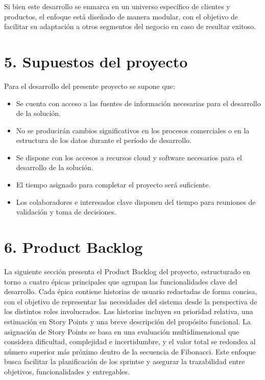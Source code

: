 \documentclass[
11pt, %
]{charter}
\begin{document}
Si bien este desarrollo se enmarca en un universo específico de clientes y productos, el enfoque está diseñado de manera modular, con el objetivo de facilitar su adaptación a otros segmentos del negocio en caso de resultar exitoso.

\section{5. Supuestos del proyecto}
\label{sec:supuestos}

Para el desarrollo del presente proyecto se supone que: 
\begin{itemize}
	\item Se cuenta con acceso a las fuentes de información necesarias para el desarrollo de la solución. 
        \item No se producirán cambios significativos en los procesos comerciales o en la estructura de los datos durante el período de desarrollo.
	\item Se dispone con los accesos a recursos cloud y software necesarios para el desarrollo de la solución. 
	\item El tiempo asignado para completar el proyecto será suficiente.
        \item Los colaboradores e interesados clave disponen del tiempo para reuniones de validación y toma de decisiones.
\end{itemize}

\section{6. Product Backlog}
\label{sec:backlog}

La siguiente sección presenta el Product Backlog del proyecto, estructurado en torno a cuatro épicas principales que agrupan las funcionalidades clave del desarrollo. Cada épica contiene historias de usuario redactadas de forma concisa, con el objetivo de representar las necesidades del sistema desde la perspectiva de los distintos roles involucrados. Las historias incluyen su prioridad relativa, una estimación en Story Points y una breve descripción del propósito funcional. La asignación de Story Points se basa en una evaluación multidimensional que considera dificultad, complejidad e incertidumbre, y el valor total se redondea al número superior más próximo dentro de la secuencia de Fibonacci. Este enfoque busca facilitar la planificación de los sprintse y asegurar la trazabilidad entre objetivos, funcionalidades y entregables.
\end{document}
